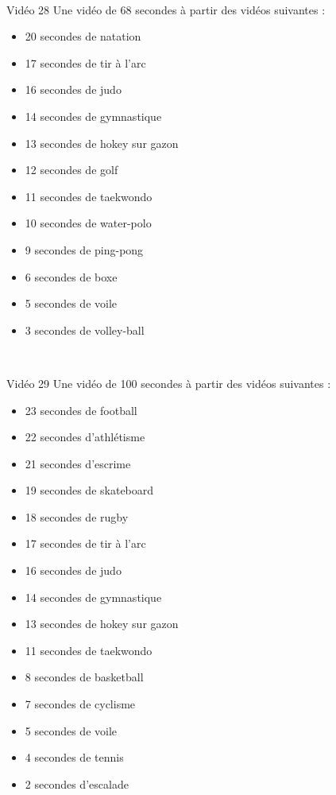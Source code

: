 \documentclass[10pt, a5paper,twoside]{article}
\begin{document}
\vfill

\clearpage
~
\vfill

\begin{card}[width = \textwidth, colback = olympicyellow, colframe = olympicyellow, bottomtitle = 2mm]{Vidéo 28}
  Une vidéo de 68 secondes à partir des vidéos suivantes :
  \vspace{-1mm}\begin{itemize}
    \item 20 secondes de natation
    \item 17 secondes de tir à l'arc
    \item 16 secondes de judo
    \item 14 secondes de gymnastique
    \item 13 secondes de hokey sur gazon
    \item 12 secondes de golf
    \item 11 secondes de taekwondo
    \item 10 secondes de water-polo
    \item 9 secondes de ping-pong
    \item 6 secondes de boxe
    \item 5 secondes de voile
    \item 3 secondes de volley-ball
  \end{itemize}
\end{card}

\vfill

\clearpage
~
\vfill

\begin{card}[width = \textwidth, colback = olympicyellow, colframe = olympicyellow, bottomtitle = 2mm]{Vidéo 29}
  Une vidéo de 100 secondes à partir des vidéos suivantes :
  \vspace{-5mm}\begin{itemize}
    \item 23 secondes de football
    \item 22 secondes d'athlétisme
    \item 21 secondes d'escrime
    \item 19 secondes de skateboard
    \item 18 secondes de rugby
    \item 17 secondes de tir à l'arc
    \item 16 secondes de judo
    \item 14 secondes de gymnastique
    \item 13 secondes de hokey sur gazon
    \item 11 secondes de taekwondo
    \item 8 secondes de basketball
    \item 7 secondes de cyclisme
    \item 5 secondes de voile
    \item 4 secondes de tennis
    \item 2 secondes d'escalade
  \end{itemize}
\end{card}
\end{document}
